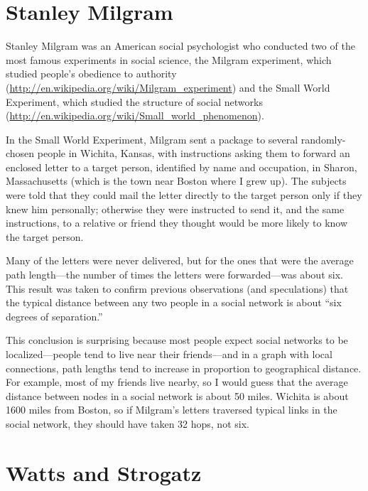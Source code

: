 \documentclass[10pt]{book}
\begin{document}
\section{Stanley Milgram}

Stanley Milgram was an American social psychologist who conducted
two of the most famous experiments in social science, the
Milgram experiment, which studied people's obedience to authority
(\url{http://en.wikipedia.org/wiki/Milgram_experiment})
and the Small World Experiment, which studied
the structure of social networks
(\url{http://en.wikipedia.org/wiki/Small_world_phenomenon}).

In the Small World Experiment, Milgram sent a package to several
randomly-chosen people in Wichita, Kansas, with instructions asking
them to forward an enclosed letter to a target person, identified by
name and occupation, in Sharon, Massachusetts (which is the town near
Boston where I grew up).  The subjects were told that they could mail
the letter directly to the target person only if they knew him
personally; otherwise they were instructed to send it, and the same
instructions, to a relative or friend they thought would be more
likely to know the target person.

Many of the letters were never delivered, but for the ones that
were the average path length---the number of
times the letters were forwarded---was about six.  This result
was taken to confirm previous observations (and speculations) that
the typical distance between any two people in a social network
is about ``six degrees of separation.''

This conclusion is surprising because most people expect social
networks to be localized---people tend to live near their
friends---and in a graph with local connections, path lengths tend to
increase in proportion to geographical distance.  For example, most of
my friends live nearby, so I would guess that the average distance
between nodes in a social network is about 50 miles.  Wichita is about
1600 miles from Boston, so if Milgram's letters traversed typical
links in the social network, they should have taken 32 hops, not six.


\section{Watts and Strogatz}
\end{document}
